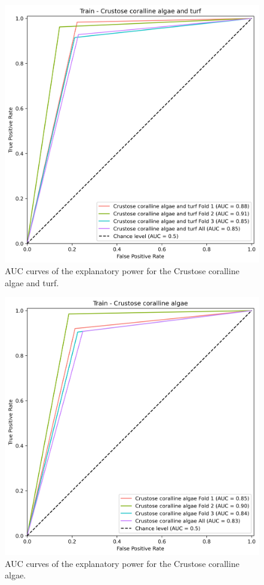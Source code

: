 \begin{figure}
\hypertarget{fig:chap3figS11}{%
\centering
\includegraphics{03-Chapitre3/figures/supplementary/03-receiver_operator_curve_train_rf_Crustose coralline algae and turf.png}
\caption{AUC curves of the explanatory power for the Crustose coralline
algae and turf.}\label{fig:chap3figS11}
}
\end{figure}

\begin{figure}
\hypertarget{fig:chap3figS12}{%
\centering
\includegraphics{03-Chapitre3/figures/supplementary/03-receiver_operator_curve_train_rf_Crustose coralline algae.png}
\caption{AUC curves of the explanatory power for the Crustose coralline
algae.}\label{fig:chap3figS12}
}
\end{figure}

